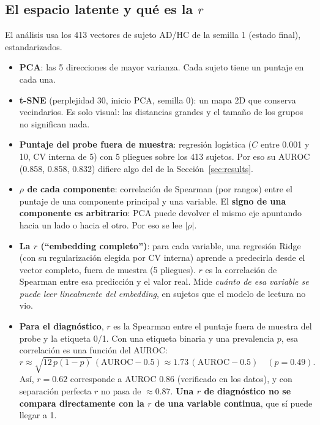 \documentclass[11pt,a4paper]{article}
\begin{document}
\subsection{\texorpdfstring{El espacio latente y qué es la $r$}{El espacio latente y qué es la r}}
\label{sec:rdef}

El análisis usa los 413 vectores de sujeto AD/HC de la semilla 1 (estado final), estandarizados.
\begin{itemize}
\item \textbf{PCA}: las 5 direcciones de mayor varianza. Cada sujeto tiene un puntaje en cada una.
\item \textbf{t-SNE} (perplejidad 30, inicio PCA, semilla 0): un mapa 2D que conserva vecindarios.
  Es solo visual: las distancias grandes y el tamaño de los grupos no significan nada.
\item \textbf{Puntaje del probe fuera de muestra}: regresión logística ($C$ entre 0.001 y 10, CV
  interna de 5) con 5 pliegues sobre los 413 sujetos. Por eso su AUROC (0.858, 0.858, 0.832) difiere
  algo del de la Sección~\ref{sec:results}.
\item \textbf{$\rho$ de cada componente}: correlación de Spearman (por rangos) entre el puntaje de
  una componente principal y una variable. El \textbf{signo de una componente es arbitrario}: PCA
  puede devolver el mismo eje apuntando hacia un lado o hacia el otro. Por eso se lee $|\rho|$.
\item \textbf{La $r$ (``embedding completo'')}: para cada variable, una regresión Ridge (con su
  regularización elegida por CV interna) aprende a predecirla desde el vector completo, fuera de
  muestra (5 pliegues). $r$ es la correlación de Spearman entre esa predicción y el valor real.
  Mide \emph{cuánto de esa variable se puede leer linealmente del embedding}, en sujetos que el
  modelo de lectura no vio.
\item \textbf{Para el diagnóstico}, $r$ es la Spearman entre el puntaje fuera de muestra del probe y
  la etiqueta 0/1. Con una etiqueta binaria y una prevalencia $p$, esa correlación es una función
  del AUROC:
  \[ r \approx \sqrt{12\,p(1-p)}\,(\mathrm{AUROC}-0.5) \approx 1.73\,(\mathrm{AUROC}-0.5)
     \quad (p=0.49). \]
  Así, $r=0.62$ corresponde a AUROC 0.86 (verificado en los datos), y con separación perfecta $r$ no
  pasa de $\approx0.87$. \textbf{Una $r$ de diagnóstico no se compara directamente con la $r$ de una
  variable continua}, que sí puede llegar a 1.
\end{itemize}
\end{document}
